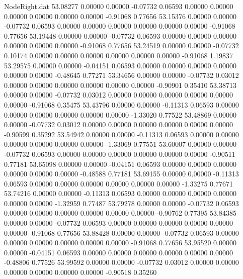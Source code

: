 \begin{filecontents}{NodeRight.dat}
  53.08277    0.00000    0.00000    -0.07732    0.06593    0.00000    0.00000    0.00000    0.00000    0.00000    0.00000   -0.91068    0.77656
  53.15376    0.00000    0.00000    -0.07732    0.06593    0.00000    0.00000    0.00000    0.00000    0.00000    0.00000   -0.91068    0.77656
  53.19448    0.00000    0.00000    -0.07732    0.06593    0.00000    0.00000    0.00000    0.00000    0.00000    0.00000   -0.91068    0.77656
  53.24519    0.00000    0.00000    -0.07732    0.10174    0.00000    0.00000    0.00000    0.00000    0.00000    0.00000   -0.91068    1.19837
  53.29575    0.00000    0.00000    -0.04151    0.06593    0.00000    0.00000    0.00000    0.00000    0.00000    0.00000   -0.48645    0.77271
  53.34656    0.00000    0.00000    -0.07732    0.03012    0.00000    0.00000    0.00000    0.00000    0.00000    0.00000   -0.90901    0.35410
  53.38713    0.00000    0.00000    -0.07732    0.03012    0.00000    0.00000    0.00000    0.00000    0.00000    0.00000   -0.91068    0.35475
  53.43796    0.00000    0.00000    -0.11313    0.06593    0.00000    0.00000    0.00000    0.00000    0.00000    0.00000   -1.33020    0.77522
  53.48869    0.00000    0.00000    -0.07732    0.03012    0.00000    0.00000    0.00000    0.00000    0.00000    0.00000   -0.90599    0.35292
  53.54942    0.00000    0.00000    -0.11313    0.06593    0.00000    0.00000    0.00000    0.00000    0.00000    0.00000   -1.33069    0.77551
  53.60007    0.00000    0.00000    -0.07732    0.06593    0.00000    0.00000    0.00000    0.00000    0.00000    0.00000   -0.90511    0.77181
  53.65098    0.00000    0.00000    -0.04151    0.06593    0.00000    0.00000    0.00000    0.00000    0.00000    0.00000   -0.48588    0.77181
  53.69155    0.00000    0.00000    -0.11313    0.06593    0.00000    0.00000    0.00000    0.00000    0.00000    0.00000   -1.33275    0.77671
  53.74216    0.00000    0.00000    -0.11313    0.06593    0.00000    0.00000    0.00000    0.00000    0.00000    0.00000   -1.32959    0.77487
  53.79278    0.00000    0.00000    -0.07732    0.06593    0.00000    0.00000    0.00000    0.00000    0.00000    0.00000   -0.90762    0.77395
  53.84385    0.00000    0.00000    -0.07732    0.06593    0.00000    0.00000    0.00000    0.00000    0.00000    0.00000   -0.91068    0.77656
  53.88428    0.00000    0.00000    -0.07732    0.06593    0.00000    0.00000    0.00000    0.00000    0.00000    0.00000   -0.91068    0.77656
  53.95520    0.00000    0.00000    -0.04151    0.06593    0.00000    0.00000    0.00000    0.00000    0.00000    0.00000   -0.48806    0.77526
  53.99592    0.00000    0.00000    -0.07732    0.03012    0.00000    0.00000    0.00000    0.00000    0.00000    0.00000   -0.90518    0.35260

\end{filecontents}
